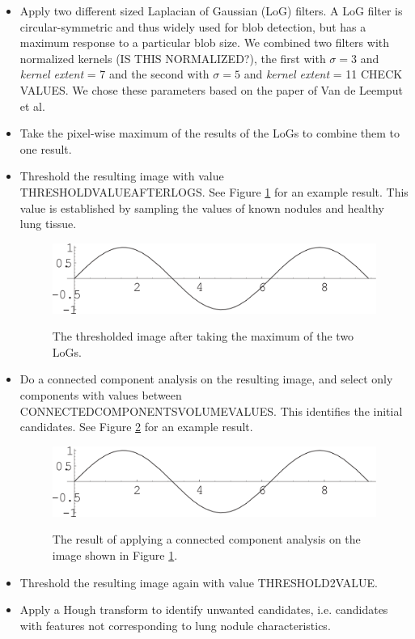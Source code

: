 \documentclass{article}
\begin{document}
\begin{itemize}
\item Apply two different sized Laplacian of Gaussian (LoG) filters. A LoG filter is circular-symmetric and thus widely used for blob detection, but has a maximum response to a particular blob size. We combined two filters with normalized kernels (IS THIS NORMALIZED?), the first with $\sigma = 3$ and \emph{kernel extent} = 7 and the second with $\sigma = 5$ and \emph{kernel extent} = 11 CHECK VALUES. We chose these parameters based on the paper of Van de Leemput et al. \cite{leemput}
\item Take the pixel-wise maximum of the results of the LoGs to combine them to one result.
\item Threshold the resulting image with value THRESHOLDVALUEAFTERLOGS. See Figure \ref{figure:LoGresult} for an example result. This value is established by sampling the values of known nodules and healthy lung tissue.
\begin{figure}[h]
\centering
{\includegraphics[width=0.7\linewidth]{./figure.png}}
\caption{The thresholded image after taking the maximum of the two LoGs. \label{figure:LoGresult}}
\end{figure}
\item Do a connected component analysis on the resulting image, and select only components with values between CONNECTEDCOMPONENTSVOLUMEVALUES. This identifies the initial candidates. See Figure \ref{figure:conncomp} for an example result.
\begin{figure}[h]
\centering
{\includegraphics[width=0.7\linewidth]{./figure.png}}
\caption{The result of applying a connected component analysis on the image shown in Figure \ref{figure:LoGresult}. \label{figure:conncomp}}
\end{figure}
\item Threshold the resulting image again with value THRESHOLD2VALUE.
\item Apply a Hough transform to identify unwanted candidates, i.e. candidates with features not corresponding to lung nodule characteristics.

\end{itemize}
\end{document}
